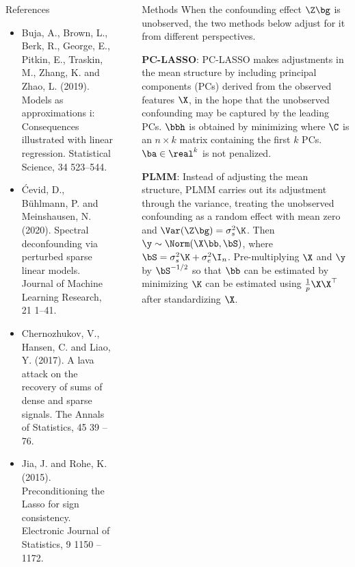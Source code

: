 \documentclass[final]{beamer}
\newlength{\sepwidth}
\newlength{\colwidth}
\newcommand{\separatorcolumn}{\begin{column}{\sepwidth}\end{column}}
\begin{document}
\begin{frame}[t]
\begin{columns}[t]
\begin{column}{\colwidth}
      \begin{block}{References}

        \small{
          \begin{itemize}
          \item Buja, A., Brown, L., Berk, R., George, E., Pitkin, E., Traskin, M., Zhang, K. and Zhao, L. (2019). Models as approximations i: Consequences illustrated with linear regression. Statistical Science, 34 523–544.
          \item Ćevid, D., Bühlmann, P. and Meinshausen, N. (2020). Spectral deconfounding via perturbed sparse linear models. Journal of Machine Learning Research, 21 1–41.
          \item Chernozhukov, V., Hansen, C. and Liao, Y. (2017). A lava attack on the recovery of sums of dense and sparse signals. The Annals of Statistics, 45 39 – 76.
          \item Jia, J. and Rohe, K. (2015). Preconditioning the Lasso for sign consistency. Electronic Journal of Statistics, 9 1150 – 1172.
          \end{itemize}
        }

      \end{block}
      
    \end{column}

    \separatorcolumn

    \begin{column}{\colwidth}

      \begin{block}{Methods}
        When the confounding effect $\Z\bg$ is unobserved, the two methods below adjust for it from different perspectives. 
        
        \textbf{PC-LASSO}: 
        PC-LASSO makes adjustments in the mean structure by including principal components (PCs) derived from the observed features $\X$, in the hope that the unobserved confounding may be captured by the leading PCs. $\bbh$ is obtained by minimizing 
        where $\C$ is an $n\times k$ matrix containing the first $k$ PCs. $\ba \in \real^k$ is not penalized. 

        \textbf{PLMM}: 
        Instead of adjusting the mean structure, PLMM carries out its adjustment through the variance, treating the unobserved confounding as a random effect with mean zero and $\Var(\Z\bg) = \sigma_s^2\K$. Then $\y \sim \Norm(\X\bb, \bS)$, where $\bS=\sigma_s^2\K + \sigma_e^2\I_n$. Pre-multiplying $\X$ and $\y$ by $\bS^{-1/2}$ so that $\bb$ can be estimated by minimizing 
        $\K$ can be estimated using $\frac{1}{p}\X\X^\top$ after standardizing $\X$. 
      \end{block}


\end{column}
\end{columns}
\end{frame}
\end{document}

